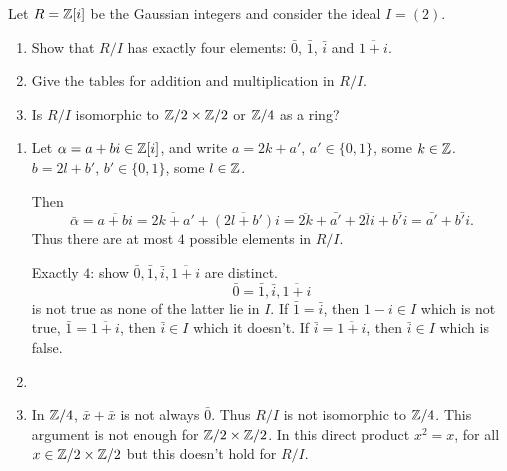 \documentclass[10pt, a4paper]{article}
\begin{document}
\begin{problem}
    Let $R = \mathbb{Z}[i]$ be the Gaussian integers and consider the ideal $I = (2)$.

    \begin{enumerate}[label = (\roman*)]
        \item Show that $R / I$ has exactly four elements:
        $\bar{0}$,
        $\bar{1}$,
        $\bar{i}$ and $\overline{1 + i}$.

        \item Give the tables for addition and multiplication in $R / I$.

        \item Is $R / I$ isomorphic to $\mathbb{Z} / 2 \times \mathbb{Z} / 2$ or $\mathbb{Z} / 4$ as a ring?
    \end{enumerate}

    \begin{solution}\phantom{}
        \begin{enumerate}[label = (\roman*)]
            \item
            Let $\alpha = a + bi \in \mathbb{Z}[i]$,
            and write $a = 2k + a'$,
            $a' \in \{0, 1\}$,
            some $k \in \mathbb{Z}$.
            $b = 2l + b'$,
            $b' \in \{0, 1\}$,
            some $l \in \mathbb{Z}$.

            Then
            \[
            \bar{\alpha} = \overline{a + bi} = \overline{2k + a'} + \overline{(2l + b')}i = \overline{2k} + \bar{a'} + \overline{2li} + \bar{b'i} = \bar{a'} + \bar{b'i}.
            \]
            Thus there are at most $4$ possible elements in $R / I$.

            Exactly $4$:
            show $\bar{0}, \bar{1}, \bar{i}, \overline{1 + i}$ are distinct.
            \[
            \bar{0} = \bar{1}, \bar{i}, \overline{1 + i}
            \]
            is not true as none of the latter lie in $I$.
            If $\bar{1} = \bar{i}$,
            then $1 - i \in I$ which is not true,
            $\bar{1} = \overline{1 + i}$,
            then $\bar{i} \in I$ which it doesn't.
            If $\bar{i} = \overline{1 + i}$,
            then $\bar{i} \in I$ which is false.

            \item

            \item In $\mathbb{Z} / 4$,
            $\bar{x} + \bar{x}$ is not always $\bar{0}$.
            Thus $R / I$ is not isomorphic to $\mathbb{Z} / 4$.
            This argument is not enough for $\mathbb{Z} / 2 \times \mathbb{Z} / 2$.
            In this direct product $x ^ 2 = x$,
            for all $x \in \mathbb{Z} / 2 \times \mathbb{Z} / 2$ but this doesn't hold for $R / I$.
        \end{enumerate}
    \end{solution}
\end{problem}
\end{document}
